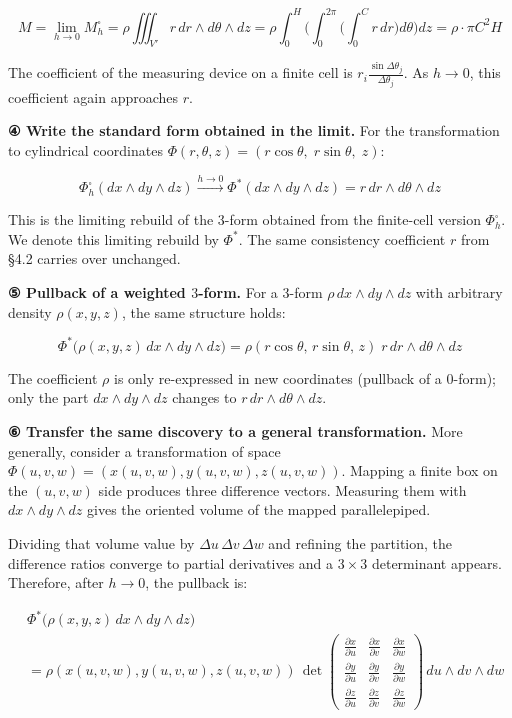 \[
M
=
\lim_{h\to0} M_h^\square
=
\rho\iiint_{V'} r\,dr\wedge d\theta\wedge dz
=
\rho
\int_0^H
\biggl(
  \int_0^{2\pi}
  \biggl(
    \int_0^C r\,dr
  \biggr)
  d\theta
\biggr)
dz
=
\rho\cdot\pi C^2H
\]

The coefficient of the measuring device on a finite cell is
\(r_i\frac{\sin\Delta\theta_j}{\Delta\theta_j}\). As \(h\to0\), this
coefficient again approaches \(r\).

\textbf{④ Write the standard form obtained in the limit.} For the
transformation to cylindrical coordinates
\(\Phi(r,\theta,z) = (r\cos\theta,\; r\sin\theta,\; z)\):

\[
\Phi_h^\square(dx\wedge dy\wedge dz)
\xrightarrow{h\to0}
\Phi^*(dx \wedge dy \wedge dz)
=
r\,dr \wedge d\theta \wedge dz
\]

This is the limiting rebuild of the \(3\)-form obtained from the
finite-cell version \(\Phi_h^\square\). We denote this limiting rebuild
by \(\Phi^*\). The same consistency coefficient \(r\) from §4.2 carries
over unchanged.

\textbf{⑤ Pullback of a weighted $3$-form.} For a \(3\)-form
\(\rho\,dx \wedge dy \wedge dz\) with arbitrary density \(\rho(x,y,z)\),
the same structure holds:

\[\Phi^*\bigl(\rho(x,y,z)\,dx \wedge dy \wedge dz\bigr) = \rho(r\cos\theta,\, r\sin\theta,\, z)\; r\,dr \wedge d\theta \wedge dz\]

The coefficient \(\rho\) is only re-expressed in new coordinates
(pullback of a \(0\)-form); only the part \(dx \wedge dy \wedge dz\)
changes to \(r\,dr \wedge d\theta \wedge dz\).

\textbf{⑥ Transfer the same discovery to a general transformation.} More
generally, consider a transformation of space
\(\Phi(u,v,w) = (x(u,v,w), y(u,v,w), z(u,v,w))\). Mapping a finite box
on the \((u,v,w)\) side produces three difference vectors. Measuring
them with \(dx\wedge dy\wedge dz\) gives the oriented volume of the
mapped parallelepiped.

Dividing that volume value by \(\Delta u\,\Delta v\,\Delta w\) and
refining the partition, the difference ratios converge to partial
derivatives and a \(3\times3\) determinant appears. Therefore, after
\(h\to0\), the pullback is:

\[
\begin{aligned}
&\Phi^*\bigl(\rho(x,y,z)\,dx \wedge dy \wedge dz\bigr) \\
&= \rho(x(u,v,w), y(u,v,w), z(u,v,w))\,
\det\!\begin{pmatrix}
\frac{\partial x}{\partial u} & \frac{\partial x}{\partial v} & \frac{\partial x}{\partial w} \\[6pt]
\frac{\partial y}{\partial u} & \frac{\partial y}{\partial v} & \frac{\partial y}{\partial w} \\[6pt]
\frac{\partial z}{\partial u} & \frac{\partial z}{\partial v} & \frac{\partial z}{\partial w}
\end{pmatrix}
\,du \wedge dv \wedge dw
\end{aligned}
\]

